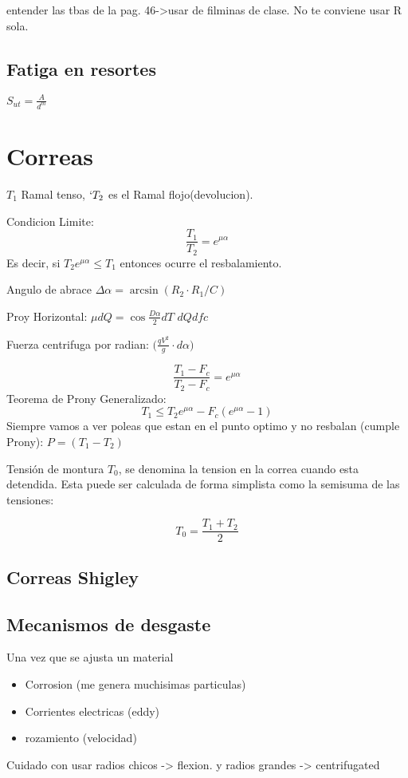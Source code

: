 \documentclass[twocolumn,10pt]{article}
\begin{document}
entender las tbas de la pag. 46->usar de filminas de clase. No te conviene usar R sola.
\subsection{Fatiga en resortes}
$S_{ut}=\frac{A}{d^m}$

\section{Correas}
$T_1$ Ramal tenso, $`T_2$ es el Ramal flojo(devolucion).

Condicion Limite:
$$\frac{T_1}{T_2}=e^{\mu \alpha } $$
Es decir, si $T_2e^{\mu\alpha}\leq T_1$ entonces ocurre el resbalamiento.



Angulo de abrace $\Delta\alpha = \arcsin (R_2\cdot R_1 / C)$

Proy Horizontal: $\mu dQ=\cos \frac{D\alpha}{2}dT$
$dQ dfc$

Fuerza centrifuga por radian: $\bigg(   \frac{q V^2}{g}\cdot d\alpha \bigg)$

$$ \frac{T_1-F_c}{T_2-F_c}=e^{\mu \alpha}$$
Teorema de Prony Generalizado:
$$ T_1\leq T_2 e^{\mu \alpha}-F_c(e^{\mu \alpha}-1)  $$
Siempre vamos a ver poleas que estan en el punto optimo y no resbalan (cumple Prony): $P=(T_1-T_2)$

Tensión de montura $T_0$, se denomina la tension en la correa cuando esta detendida. Esta puede ser calculada de forma simplista como la semisuma de las tensiones:

$$T_0=\frac{T_1+T_2}{2} $$

\subsection{Correas Shigley}

\subsection{Mecanismos de desgaste}
Una vez que se ajusta un material 
\begin{itemize}
\item Corrosion (me genera muchisimas particulas)
\item Corrientes electricas (eddy)
\item rozamiento (velocidad)
\end{itemize}

Cuidado con usar radios chicos -> flexion. y radios grandes -> centrifugated
\end{document}
